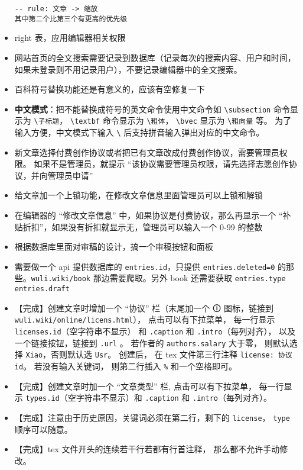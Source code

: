 \begin{itemize}
\begin{lstlisting}[language=none]
-- rule: 文章 -> 缩放
其中第二个比第三个有更高的优先级
\end{lstlisting}
\item right 表，应用编辑器相关权限
\item 网站首页的全文搜索需要记录到数据库（记录每次的搜索内容、用户和时间，如果未登录则不用记录用户），不要记录编辑器中的全文搜索。
\item 百科符号替换功能还是有意义的，应该有空修复一下
\item \textbf{中文模式}：把不能替换成符号的英文命令使用中文命令如 \verb`\subsection` 命令显示为 \verb`\子标题`， \verb`\textbf` 命令显示为 \verb`\粗体`， \verb`\bvec` 显示为 \verb`\粗向量` 等。 为了输入方便，中文模式下输入 \verb`\` 后支持拼音输入弹出对应的中文命令。
\item 新文章选择付费创作协议或者把已有文章改成付费创作协议，需要管理员权限。 如果不是管理员，就提示 “该协议需要管理员权限，请先选择志愿创作协议，并向管理员申请”
\item 给文章加一个上锁功能，在修改文章信息里面管理员可以上锁和解锁
\item 在编辑器的 “修改文章信息” 中，如果协议是付费协议，那么再显示一个 “补贴折扣”，如果没有折扣就显示无，管理员可以输入一个 0-99 的整数
\item 根据数据库里面对审稿的设计，搞一个审稿按钮和面板
\item 需要做一个 api 提供数据库的 \verb`entries.id`，只提供 \verb`entries.deleted=0` 的那些。\verb`wuli.wiki/book` 那边需要爬取。另外 book 还需要获取 \verb`entries.type entries.draft`
\item 【完成】创建文章时增加一个 “协议” 栏（末尾加一个 🛈 图标，链接到 \verb`wuli.wiki/online/licens.html`）， 点击可以有下拉菜单， 每一行显示 \verb`licenses.id`（空字符串不显示） 和 \verb`.caption` 和 \verb`.intro`（每列对齐）， 以及一个链接按钮，链接到 \verb`.url` 。 若作者的 \verb`authors.salary` 大于零， 则默认选择 \verb`Xiao`，否则默认选 \verb`Usr`。 创建后， 在 tex 文件第三行注释 \verb`license: 协议id`。 若没有输入关键词， 则第二行插入 \verb`%` 和一个空格即可。
\item 【完成】创建文章时加一个 “文章类型” 栏, 点击可以有下拉菜单， 每一行显示 \verb`types.id`（空字符串不显示）和 \verb`.caption` 和 \verb`.intro`（每列对齐）。 
\item 【完成】注意由于历史原因，关键词必须在第二行，剩下的 \verb`license`， \verb`type` 顺序可以随意。
\item 【完成】tex 文件开头的连续若干行若都有行首注释， 那么都不允许手动修改。

\end{itemize}

